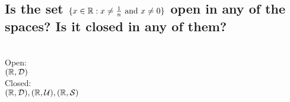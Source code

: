 \begin{parts}
\part{Is the set $\{x \in \mathbb{R}: x \neq \frac{1}{n} \text{ and } x \neq 0\}$ open in any of the spaces? Is it closed in any of them?}

\begin{solution}
 \\Open: \\
 $(\mathbb{R}, \mathcal{D})$ \\
 Closed: \\
 $(\mathbb{R}, \mathcal{D}), (\mathbb{R}, \mathcal{U}), (\mathbb{R}, \mathcal{S})$ \\
\end{solution}

\end{parts}


